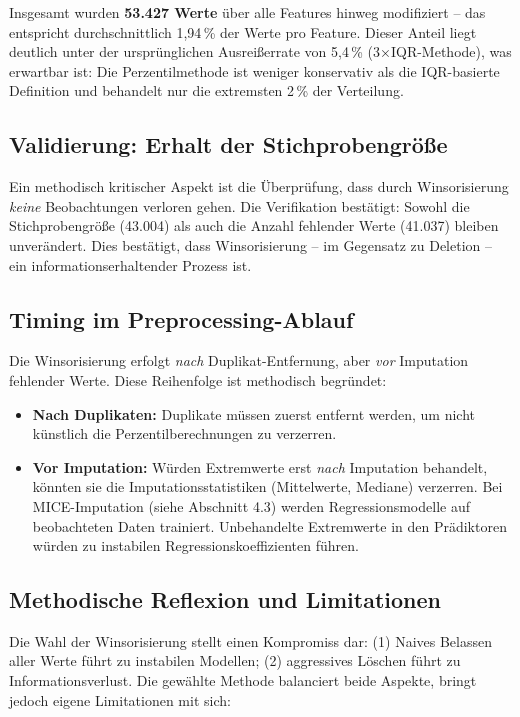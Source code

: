 Insgesamt wurden \textbf{53.427 Werte} über alle Features hinweg modifiziert – das entspricht durchschnittlich 1,94\,\% der Werte pro Feature. Dieser Anteil liegt deutlich unter der ursprünglichen Ausreißerrate von 5,4\,\% (3×IQR-Methode), was erwartbar ist: Die Perzentilmethode ist weniger konservativ als die IQR-basierte Definition und behandelt nur die extremsten 2\,\% der Verteilung.

\subsection{Validierung: Erhalt der Stichprobengröße}

Ein methodisch kritischer Aspekt ist die Überprüfung, dass durch Winsorisierung \textit{keine} Beobachtungen verloren gehen. Die Verifikation bestätigt: Sowohl die Stichprobengröße (43.004) als auch die Anzahl fehlender Werte (41.037) bleiben unverändert. Dies bestätigt, dass Winsorisierung – im Gegensatz zu Deletion – ein informationserhaltender Prozess ist.

\subsection{Timing im Preprocessing-Ablauf}

Die Winsorisierung erfolgt \textit{nach} Duplikat-Entfernung, aber \textit{vor} Imputation fehlender Werte. Diese Reihenfolge ist methodisch begründet:

\begin{itemize}[topsep=0.2\baselineskip]
    \item \textbf{Nach Duplikaten:} Duplikate müssen zuerst entfernt werden, um nicht künstlich die Perzentilberechnungen zu verzerren.
    \item \textbf{Vor Imputation:} Würden Extremwerte erst \textit{nach} Imputation behandelt, könnten sie die Imputationsstatistiken (Mittelwerte, Mediane) verzerren. Bei MICE-Imputation (siehe Abschnitt 4.3) werden Regressionsmodelle auf beobachteten Daten trainiert. Unbehandelte Extremwerte in den Prädiktoren würden zu instabilen Regressionskoeffizienten führen.
\end{itemize}

\subsection{Methodische Reflexion und Limitationen}

Die Wahl der Winsorisierung stellt einen Kompromiss dar: (1) Naives Belassen aller Werte führt zu instabilen Modellen; (2) aggressives Löschen führt zu Informationsverlust. Die gewählte Methode balanciert beide Aspekte, bringt jedoch eigene Limitationen mit sich:

